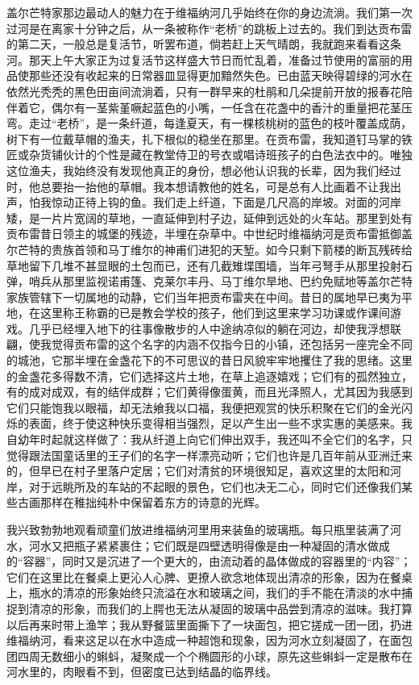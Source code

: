 \par 盖尔芒特家那边最动人的魅力在于维福纳河几乎始终在你的身边流淌。我们第一次过河是在离家十分钟之后，从一条被称作“老桥”的跳板上过去的。我们到达贡布雷的第二天，一般总是复活节，听罢布道，倘若赶上天气晴朗，我就跑来看看这条河。那天上午大家正为过复活节这样盛大节日而忙乱着，准备过节使用的富丽的用品使那些还没有收起来的日常器皿显得更加黯然失色。已由蓝天映得碧绿的河水在依然光秃秃的黑色田亩间流淌着，只有一群早来的杜鹃和几朵提前开放的报春花陪伴着它，偶尔有一茎紫堇噘起蓝色的小嘴，一任含在花盏中的香汁的重量把花茎压弯。走过“老桥”，是一条纤道，每逢夏天，有一棵核桃树的蓝色的枝叶覆盖成荫，树下有一位戴草帽的渔夫，扎下根似的稳坐在那里。在贡布雷，我知道钉马掌的铁匠或杂货铺伙计的个性是藏在教堂侍卫的号衣或唱诗班孩子的白色法衣中的。唯独这位渔夫，我始终没有发现他真正的身份，想必他认识我的长辈，因为我们经过时，他总要抬一抬他的草帽。我本想请教他的姓名，可是总有人比画着不让我出声，怕我惊动正待上钩的鱼。我们走上纤道，下面是几尺高的岸坡。对面的河岸矮，是一片片宽阔的草地，一直延伸到村子边，延伸到远处的火车站。那里到处有贡布雷昔日领主的城堡的残迹，半埋在杂草中。中世纪时维福纳河是贡布雷抵御盖尔芒特的贵族首领和马丁维尔的神甫们进犯的天堑。如今只剩下箭楼的断瓦残砖给草地留下几堆不甚显眼的土包而已，还有几截雉堞围墙，当年弓弩手从那里投射石弹，哨兵从那里监视诺甫篷、克莱尔丰丹、马丁维尔旱地、巴约免赋地等盖尔芒特家族管辖下一切属地的动静，它们当年把贡布雷夹在中间。昔日的属地早已夷为平地，在这里称王称霸的已是教会学校的孩子，他们到这里来学习功课或作课间游戏。几乎已经埋入地下的往事像散步的人中途纳凉似的躺在河边，却使我浮想联翩，使我觉得贡布雷的这个名字的内涵不仅指今日的小镇，还包括另一座完全不同的城池，它那半埋在金盏花下的不可思议的昔日风貌牢牢地攫住了我的思绪。这里的金盏花多得数不清，它们选择这片土地，在草上追逐嬉戏；它们有的孤然独立，有的成对成双，有的结伴成群；它们黄得像蛋黄，而且光泽照人，尤其因为我感到它们只能饱我以眼福，却无法飨我以口福，我便把观赏的快乐积聚在它们的金光闪烁的表面，终于使这种快乐变得相当强烈，足以产生出一些不求实惠的美感来。我自幼年时起就这样做了：我从纤道上向它们伸出双手，我还叫不全它们的名字，只觉得跟法国童话里的王子们的名字一样漂亮动听；它们也许是几百年前从亚洲迁来的，但早已在村子里落户定居；它们对清贫的环境很知足，喜欢这里的太阳和河岸，对于远眺所及的车站的不起眼的景色，它们也决无二心，同时它们还像我们某些古画那样在稚拙纯朴中保留着东方的诗意的光辉。
\par 我兴致勃勃地观看顽童们放进维福纳河里用来装鱼的玻璃瓶。每只瓶里装满了河水，河水又把瓶子紧紧裹住；它们既是四壁透明得像是由一种凝固的清水做成的“容器”，同时又是沉进了一个更大的，由流动着的晶体做成的容器里的“内容”；它们在这里比在餐桌上更沁人心脾、更撩人欲念地体现出清凉的形象，因为在餐桌上，瓶水的清凉的形象始终只流溢在水和玻璃之间，我们的手不能在清淡的水中捕捉到清凉的形象，而我们的上腭也无法从凝固的玻璃中品尝到清凉的滋味。我打算以后再来时带上渔竿；我从野餐篮里面撕下了一块面包，把它搓成一团一团，扔进维福纳河，看来这足以在水中造成一种超饱和现象，因为河水立刻凝固了，在面包团四周无数细小的蝌蚪，凝聚成一个个椭圆形的小球，原先这些蝌蚪一定是散布在河水里的，肉眼看不到，但密度已达到结晶的临界线。
